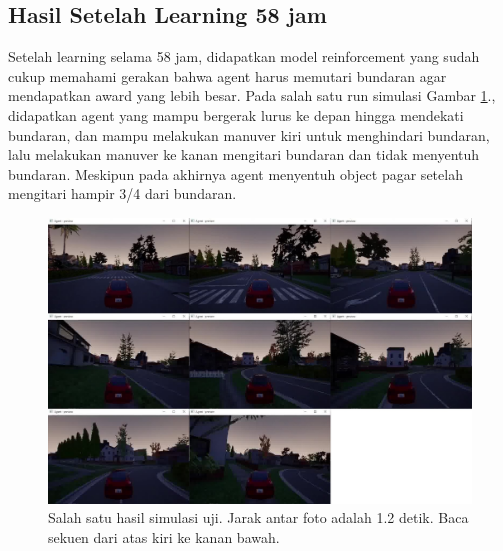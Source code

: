 \subsection{Hasil Setelah Learning 58 jam}
\label{sec:hasil_learning_12}
Setelah learning selama 58 jam, didapatkan model reinforcement yang sudah cukup memahami gerakan bahwa agent harus memutari bundaran agar mendapatkan award yang lebih besar. Pada salah satu run simulasi Gambar \ref{fig:uji1}., didapatkan agent yang mampu bergerak lurus ke depan hingga mendekati bundaran, dan mampu melakukan manuver kiri untuk menghindari bundaran, lalu melakukan manuver ke kanan mengitari bundaran dan tidak menyentuh bundaran. Meskipun pada akhirnya agent menyentuh object pagar setelah mengitari hampir 3/4 dari bundaran.
\begin{figure}[H] 
	\centering
	\includegraphics[width=1\linewidth]{images/uji1}
	\caption{Salah satu hasil simulasi uji. Jarak antar foto adalah 1.2 detik. Baca sekuen dari atas kiri ke kanan bawah.}
	\label{fig:uji1}
\end{figure}
